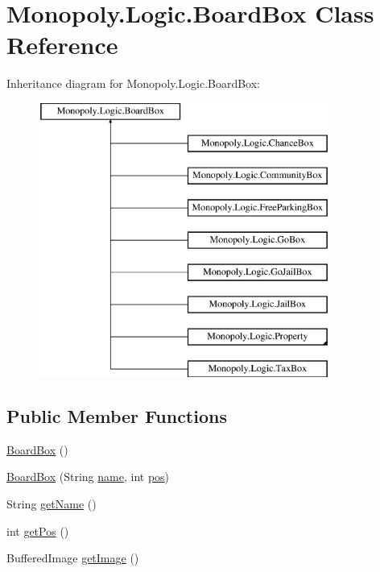 \hypertarget{class_monopoly_1_1_logic_1_1_board_box}{}\section{Monopoly.\+Logic.\+Board\+Box Class Reference}
\label{class_monopoly_1_1_logic_1_1_board_box}
Inheritance diagram for Monopoly.\+Logic.\+Board\+Box\+:\begin{figure}[H]
\begin{center}
\leavevmode
\includegraphics[height=9.000000cm]{class_monopoly_1_1_logic_1_1_board_box}
\end{center}
\end{figure}
\subsection*{Public Member Functions}
\begin{DoxyCompactItemize}
\item 
\hyperlink{class_monopoly_1_1_logic_1_1_board_box_aaba7b92a6d29974b897cca4aff9ad70f}{Board\+Box} ()
\item 
\hyperlink{class_monopoly_1_1_logic_1_1_board_box_afaca40383c3c6adf9e5ae82a2a0c0206}{Board\+Box} (String \hyperlink{class_monopoly_1_1_logic_1_1_board_box_ad5cd8d9fc191dc2df82b9fe7766210fd}{name}, int \hyperlink{class_monopoly_1_1_logic_1_1_board_box_a750c8300a134809e0eb5772b3ba92258}{pos})
\item 
String \hyperlink{class_monopoly_1_1_logic_1_1_board_box_a9b1e529489b5008b15172035b40bdec9}{get\+Name} ()
\item 
int \hyperlink{class_monopoly_1_1_logic_1_1_board_box_a4cb9795a6df15b45d01640a2a43499d9}{get\+Pos} ()
\item 
Buffered\+Image \hyperlink{class_monopoly_1_1_logic_1_1_board_box_a0fdc6f0eae85275cd1c3e5bc95e1aa1d}{get\+Image} ()
\end{DoxyCompactItemize}
